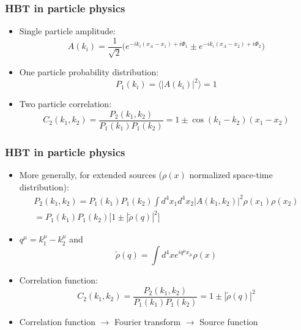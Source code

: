 \documentclass{beamer}
\begin{document}
\begin{frame}
\frametitle{HBT in particle physics}
\begin{itemize}
\setlength{\itemsep}{8pt}
\item Single particle amplitude:
\begin{equation*}
A(k_i) = \frac{1}{\sqrt{2}}\bigg(e^{-ik_i(x_A-x_1)+i\Phi_1}\pm e^{-ik_i(x_A-x_2)+i\Phi_2}\bigg)
\end{equation*}
\item One particle probability distribution:
\begin{equation*}
P_1(k_i) = \langle |A(k_i)|^2 \rangle = 1
\end{equation*}
\item Two particle correlation:
\begin{equation*}
C_2(k_1, k_2) = \frac{P_2(k_1, k_2)}{P_1(k_1)P_1(k_2)} = 1\pm \cos{(k_1-k_2)(x_1-x_2)}
\end{equation*}
\end{itemize}
\end{frame}


\begin{frame}
\frametitle{HBT in particle physics}
\begin{itemize}
\setlength{\itemsep}{8pt}
\item More generally, for extended sources ($\rho(x)$ normalized space-time distribution):
\begin{align*}
P_2(k_1, k_2) = P_1(k_1)P_1(k_2)\int d^4x_1d^4x_2 |A(k_1, k_2)|^2\rho(x_1)\rho(x_2)\\=P_1(k_1)P_1(k_2)\big[1\pm |\tilde{\rho}(q)|^2\big]
\end{align*}
\item $q^\mu=k_1^\mu-k_2^\mu$ and
\begin{equation*}
\tilde{\rho}(q)=\int d^4x e^{iq^\mu x_\mu}\rho(x)
\end{equation*}
\item Correlation function:
\begin{equation*}
C_2(k_1, k_2) = \frac{P_2(k_1, k_2)}{P_1(k_1)P_1(k_2)} = 1\pm |\tilde{\rho}(q)|^2
\end{equation*}
\item Correlation function $\rightarrow$ Fourier transform $\rightarrow$ Source function
\end{itemize}
\end{frame}
\end{document}
